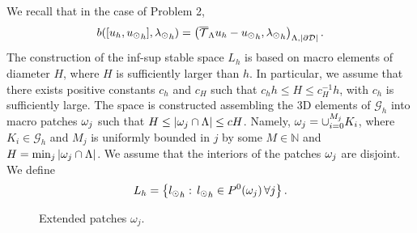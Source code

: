 We recall that in the case of Problem 2, 
\begin{equation*}
b([u_h, {u_{\odot}}_h], {\lambda_{\odot}}_h) = \left({\overline{\mathcal{T}}_\Lambda} u_h - {u_{\odot}}_h, {\lambda_{\odot}}_h\right)_{\Lambda,|\partial\mathcal{D}|}.
\end{equation*}
The construction of the inf-sup stable space $L_h$ is based on macro elements of diameter $H$, where $H$ is sufficiently larger than $h$. In particular, we assume that there exists positive constants $c_h$ and $c_H$ such that $c_h h\leq H \leq c_H^{-1}h$, with $c_h$ is sufficiently large. The space is constructed assembling the 3D elements of $\mathcal{G}_h$ into macro patches $ \omega _j $ such that $H \leq |\omega _j\cap \Lambda|\leq cH$. Namely, $\omega _j=\cup _{i=0}^{M_j} K_i$, where $K_i \in \mathcal{G}_h$ and $M_j$ is uniformly bounded in $j$ by some $M\in \mathbb{N}$ and $H=\min_{j}|\omega _j\cap \Lambda|$. We assume that the interiors of the patches $\omega _j$ are  disjoint. We define 
\begin{equation*}
L_h=\left\{{l_{\odot} }_h: \, {l_{\odot} }_h\in P^0(\omega _j)\, \forall j \right\}.
\end{equation*}

\begin{figure}\label{fig:patch}
\center

\caption{Extended patches $\omega_j$.}
\end{figure}

